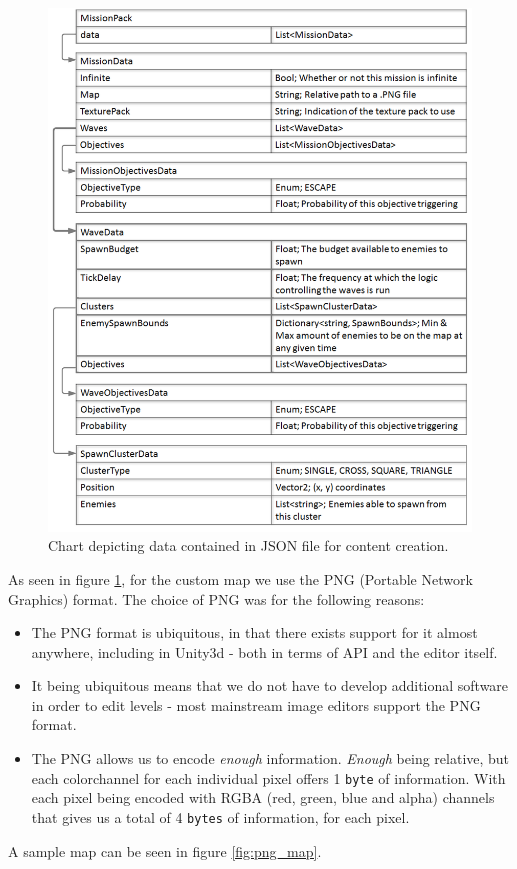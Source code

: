 \begin{figure}[H]
    \centering
    \includegraphics[width=1\textwidth]{figures/missions/chart.png}
    \caption{Chart depicting data contained in JSON file for content creation.}
    \label{fig:json_chart}
\end{figure}

As seen in figure \ref{fig:json_chart}, for the custom map we use the PNG (Portable Network Graphics) format.
The choice of PNG was for the following reasons:
\begin{itemize}
    \item The PNG format is ubiquitous, in that there exists support for it almost anywhere, including in Unity3d - both in terms of API and the editor itself.
    \item It being ubiquitous means that we do not have to develop additional software in order to edit levels - most mainstream image editors support the PNG format.
    \item The PNG allows us to encode \textit{enough} information. 
    	\textit{Enough} being relative, but each colorchannel for each individual pixel offers 1 \texttt{byte} of information.
    	With each pixel being encoded with RGBA (red, green, blue and alpha) channels that gives us a total of 4 \texttt{bytes} of information, for each pixel.
\end{itemize}

A sample map can be seen in figure \ref{fig:png_map}.